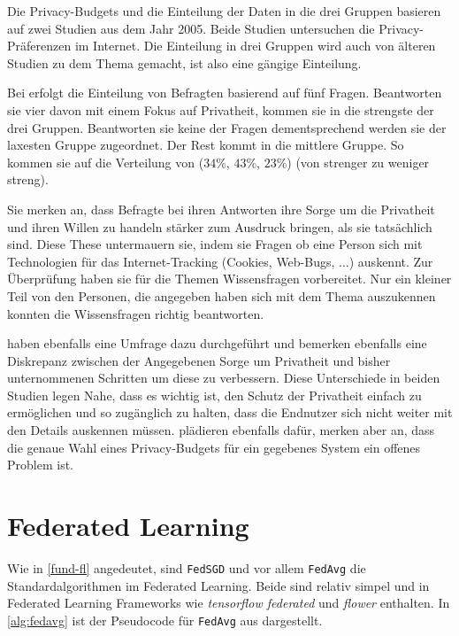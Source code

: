 Die Privacy-Budgets und die Einteilung der Daten in die drei Gruppen basieren auf zwei Studien aus dem Jahr 2005\cite{jensen:2005, acquisti:2005}. Beide Studien untersuchen die Privacy-Präferenzen im Internet. Die Einteilung in drei Gruppen wird auch von älteren Studien zu dem Thema gemacht, ist also eine gängige Einteilung\cite{westin:1998}.

Bei \textcite{jensen:2005} erfolgt die Einteilung von Befragten basierend auf fünf Fragen. Beantworten sie vier davon mit einem Fokus auf Privatheit, kommen sie in die strengste der drei Gruppen. Beantworten sie keine der Fragen dementsprechend werden sie der laxesten Gruppe zugeordnet. Der Rest kommt in die mittlere Gruppe. So kommen sie auf die Verteilung von ($34\%$, $43\%$, $23\%$) (von strenger zu weniger streng). 

Sie merken an, dass Befragte bei ihren Antworten ihre Sorge um die Privatheit und ihren Willen zu handeln stärker zum Ausdruck bringen, als sie tatsächlich sind. Diese These untermauern sie, indem sie Fragen ob eine Person sich mit Technologien für das Internet-Tracking (Cookies, Web-Bugs, ...) auskennt. Zur Überprüfung haben sie für die Themen Wissensfragen vorbereitet. Nur ein kleiner Teil von den Personen, die angegeben haben sich mit dem Thema auszukennen konnten die Wissensfragen richtig beantworten.

\textcite{acquisti:2005} haben ebenfalls eine Umfrage dazu durchgeführt und bemerken ebenfalls eine Diskrepanz zwischen der Angegebenen Sorge um Privatheit und bisher unternommenen Schritten um diese zu verbessern. Diese Unterschiede in beiden Studien legen Nahe, dass es wichtig ist, den Schutz der Privatheit einfach zu ermöglichen und so zugänglich zu halten, dass die Endnutzer sich nicht weiter mit den Details auskennen müssen. \textcite{jorgensen:2015} plädieren ebenfalls dafür, merken aber an, dass die genaue Wahl eines Privacy-Budgets für ein gegebenes System ein offenes Problem ist.

\section{Federated Learning}\label{sec:rw-fl}

Wie in \autoref{fund-fl} angedeutet, sind \texttt{FedSGD} und vor allem \texttt{FedAvg} die Standardalgorithmen im Federated Learning. Beide sind relativ simpel und in Federated Learning Frameworks wie \textit{tensorflow federated} und \textit{flower} enthalten. In \autoref{alg:fedavg} ist der Pseudocode für \texttt{FedAvg} aus \cite{mcmahan:2016} dargestellt. 


